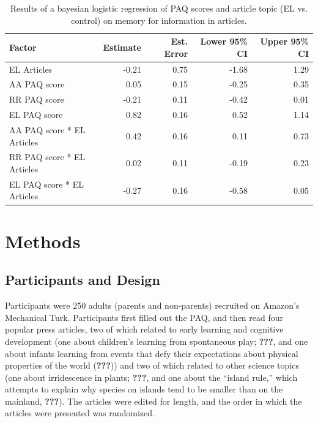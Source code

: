 \documentclass[floatsintext,man]{apa6}
\theoremstyle{definition}
\theoremstyle{definition}
\theoremstyle{definition}
\theoremstyle{remark}
\begin{document}
\begin{table}[h]
\centering
\caption{Results of a bayesian logistic regression of PAQ scores and article topic (EL vs. control) on memory for information in articles.} 
\label{tab:uptake}
\begin{tabular}{lrrrr}
  \hline
Factor & Estimate & Est. Error & Lower 95\% CI & Upper 95\% CI \\ 
  \hline
EL Articles & -0.21 & 0.75 & -1.68 & 1.29 \\ 
  AA PAQ score & 0.05 & 0.15 & -0.25 & 0.35 \\ 
  RR PAQ score & -0.21 & 0.11 & -0.42 & 0.01 \\ 
  EL PAQ score & 0.82 & 0.16 & 0.52 & 1.14 \\ 
  AA PAQ score * EL Articles & 0.42 & 0.16 & 0.11 & 0.73 \\ 
  RR PAQ score * EL Articles & 0.02 & 0.11 & -0.19 & 0.23 \\ 
  EL PAQ score * EL Articles & -0.27 & 0.16 & -0.58 & 0.05 \\ 
   \hline
\end{tabular}
\end{table}

\section{Methods}\label{methods-2}

\subsection{Participants and Design}\label{participants-and-design-2}

Participants were 250 adults (parents and non-parents) recruited on
Amazon's Mechanical Turk. Participants first filled out the PAQ, and
then read four popular press articles, two of which related to early
learning and cognitive development (one about children's learning from
spontaneous play; {\textbf{???}}, and one about infants learning from
events that defy their expectations about physical properties of the
world ({\textbf{???}})) and two of which related to other science topics
(one about irridescence in plants; {\textbf{???}}, and one about the
``island rule,'' which attempts to explain why species on islands tend
to be smaller than on the mainland, {\textbf{???}}). The articles were
edited for length, and the order in which the articles were presented
was randomized.
\end{document}
